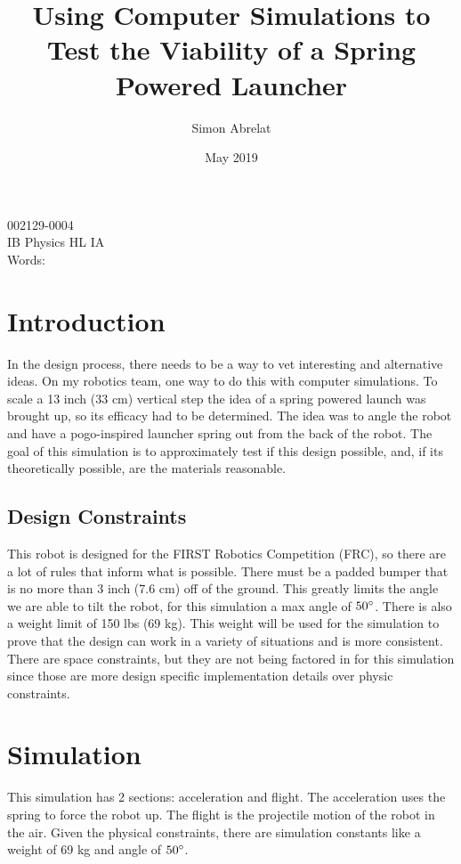 \documentclass[12pt, letterpaper]{article}
\title{Using Computer Simulations to Test the Viability of a Spring Powered Launcher}
\author{Simon Abrelat}
\date{May 2019}
\begin{document}
\large
\doublespace{}
\parindent=0.5in

{\fontsize{12}{14.4}
  {\singlespace
    \maketitle
    \begin{center}
    002129-0004 \\
    \vspace{4mm}
    IB Physics HL IA \\
    \vspace{4mm}
    Words:  \\ %
    \end{center}
  }
}	


\newpage
\tableofcontents
{}
\newpage

\section{Introduction}
In the design process, there needs to be a way to vet interesting and alternative ideas. On my robotics team,
one way to do this with computer simulations. To scale a 13 inch (33 cm) vertical step the idea of a spring
powered launch was brought up, so its efficacy had to be determined. The idea was to angle the robot and have
a pogo-inspired launcher spring out from the back of the robot. The goal of this simulation is to
approximately test if this design possible, and, if its theoretically possible, are the materials reasonable.

\subsection{Design Constraints}
This robot is designed for the FIRST Robotics Competition (FRC), so there are a lot of rules that inform what
is possible. There must be a padded bumper that is no more than 3 inch (7.6 cm) off of the ground. This
greatly limits the angle we are able to tilt the robot, for this simulation a max angle of $50\degree$. There
is also a weight limit of 150 lbs (69 kg). This weight will be used for the simulation to prove that the
design can work in a variety of situations and is more consistent. There are space constraints, but they are
not being factored in for this simulation since those are more design specific implementation details over
physic constraints.

\section{Simulation}
This simulation has 2 sections: acceleration and flight. The acceleration uses the spring to force the robot
up. The flight is the projectile motion of the robot in the air. Given the physical constraints, there are
simulation constants like a weight of 69 kg and angle of $50\degree$.
\end{document}
